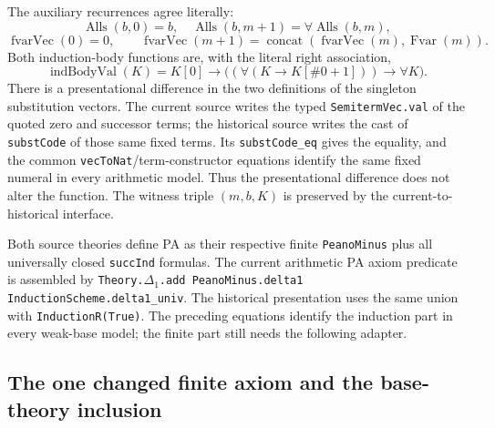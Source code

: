 The auxiliary recurrences agree literally:
\[
 \operatorname{Alls}(b,0)=b,\quad
 \operatorname{Alls}(b,m+1)=\forall\operatorname{Alls}(b,m),
\]
\[
 \operatorname{fvarVec}(0)=0,\qquad
 \operatorname{fvarVec}(m+1)=
       \operatorname{concat}(\operatorname{fvarVec}(m),
                              \operatorname{Fvar}(m)).
\]
Both induction-body functions are, with the literal right association,
\[
 \operatorname{indBodyVal}(K)=
 K[0]\longrightarrow
   \bigl((\forall(K\longrightarrow K[\#0+1]))
                   \longrightarrow\forall K\bigr).
\]
There is a presentational difference in the two definitions of the
singleton substitution vectors.  The current source writes the
typed \texttt{SemitermVec.val} of the quoted zero and successor
terms; the historical source writes the cast of
\texttt{substCode} of those same fixed terms.  Its
\texttt{substCode\_eq} gives the equality, and the common
\texttt{vecToNat}/term-constructor equations identify the same
fixed numeral in every arithmetic model.  Thus the presentational
difference does not alter the function.  The witness triple
$(m,b,K)$ is preserved by the current-to-historical interface.

Both source theories define PA as their respective finite
\texttt{PeanoMinus} plus all universally closed
\texttt{succInd} formulas.  The current arithmetic PA axiom
predicate is assembled by
\texttt{Theory.\(\Delta_1\).add PeanoMinus.delta1
InductionScheme.delta1\_univ}.  The historical presentation uses
the same union with \texttt{InductionR(True)}.  The preceding
equations identify the induction part in every weak-base model;
the finite part still needs the following adapter.

\subsection{The one changed finite axiom and the base-theory inclusion}

